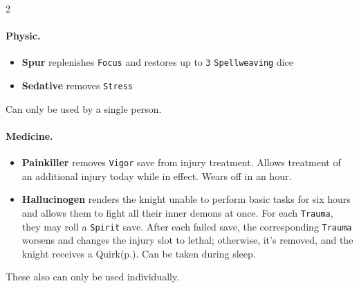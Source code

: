 \begin{multicols*}{2}
\paragraph{Physic.}
\begin{itemize}[nosep, leftmargin=*]
    \item[\ding{60}] \textbf{Spur} replenishes \texttt{Focus} and restores up to \texttt{3} \texttt{Spellweaving} dice
    \item[\ding{60}] \textbf{Sedative} removes \texttt{Stress}
\end{itemize}
Can only be used by a single person. 
\paragraph{Medicine.}
\begin{itemize}[nosep, leftmargin=*]
    \item[\ding{60}] \textbf{Painkiller} removes \texttt{Vigor} save from injury treatment. 
    Allows treatment of an additional injury today while in effect. Wears off in an hour.
    \item[\ding{60}] \textbf{Hallucinogen} renders the knight unable to perform basic tasks for six hours and allows them to fight all their inner demons at once.
    For each \texttt{Trauma}, they may roll a \texttt{Spirit} save. 
    After each failed save, the corresponding \texttt{Trauma} worsens and changes the injury slot to lethal; otherwise, it's removed, and the knight receives a Quirk(p.\pageref*{sec:quirks}).
    Can be taken during sleep.
\end{itemize}
These also can only be used individually. 


\end{multicols*}
